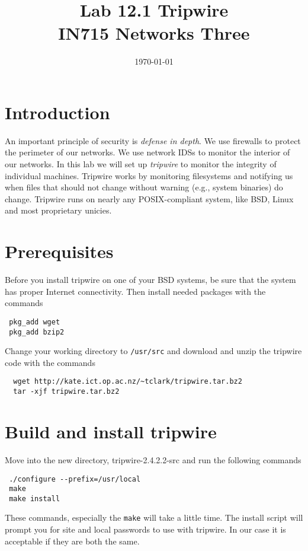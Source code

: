 \documentclass{article}
\begin{document}
\title{ Lab 12.1 Tripwire\\ IN715 Networks Three}
\date{\today}
\maketitle

\section*{Introduction}
An important principle of security is \emph{defense in depth}.  We use firewalls to protect the perimeter of our networks.  We use network IDSs to monitor the interior of our networks.  In this lab we will set up \emph{tripwire} to monitor the integrity of individual machines. Tripwire works by monitoring filesystems and notifying us when files that should not change without warning (e.g., system binaries) do change.  Tripwire runs on nearly any POSIX-compliant system, like BSD, Linux and most proprietary unicies.

\section{Prerequisites}
Before you install tripwire on one of your BSD systems, be sure that the system has proper Internet connectivity.  Then install needed packages with the commands

\begin{verbatim}
 pkg_add wget
 pkg_add bzip2
\end{verbatim}

Change your working directory to \texttt{/usr/src} and download and unzip the tripwire code with the commands

\begin{verbatim}
  wget http://kate.ict.op.ac.nz/~tclark/tripwire.tar.bz2
  tar -xjf tripwire.tar.bz2
\end{verbatim}

\section{Build and install tripwire}
Move into the new directory, {tripwire-2.4.2.2-src} and run the following commands

\begin{verbatim}
 ./configure --prefix=/usr/local
 make 
 make install
 \end{verbatim}

These commands, especially the \texttt{make} will take a little time. The install script will prompt you for site and local passwords to use with tripwire.  In our case it is acceptable if they are both the same.
\end{document}
